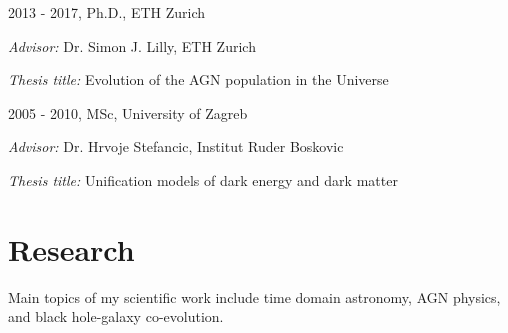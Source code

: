 \documentclass[11pt,letterpaper]{article}
\renewenvironment{itemize}{
  \begin{list}{}{
    \setlength{\leftmargin}{1.5em}
    \setlength{\itemsep}{0.10em}
    \setlength{\parskip}{0pt}
    \setlength{\parsep}{0.10em}
  }
}{
  \end{list}
}
\begin{document}
\begin{itemize}
  \item 2013 - 2017, Ph.D., ETH Zurich
  \begin{itemize}
  \item \textit{Advisor:} Dr. Simon J. Lilly, ETH Zurich
\item \textit{Thesis title:} Evolution of the AGN population in the Universe

\end{itemize}  




  \item 2005 - 2010, MSc, University of Zagreb
  \begin{itemize}
            \item \textit{Advisor:}
      Dr. Hrvoje  Stefancic, Institut Ruder Boskovic
    \item  \textit{Thesis title:}
  Unification models of dark energy and dark matter 

\end{itemize}  
\end{itemize}

\section*{Research}
 Main topics of my scientific work include time domain astronomy, AGN physics, and black hole-galaxy co-evolution. %
 
\end{document}
